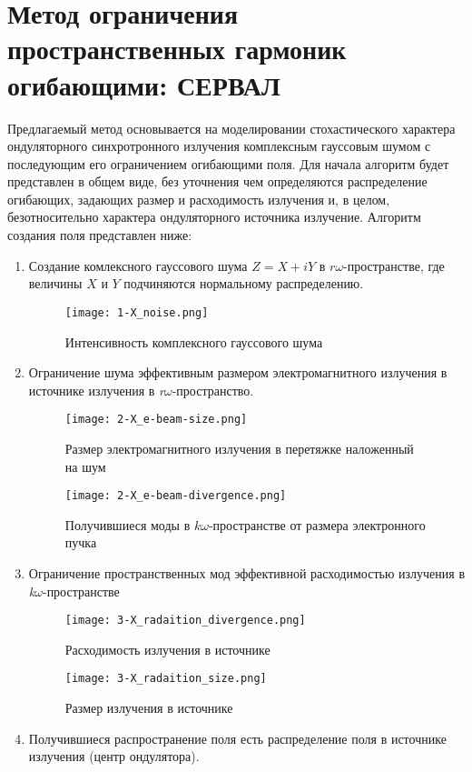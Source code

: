 \section{Метод ограничения пространственных гармоник огибающими: СЕРВАЛ}
Предлагаемый метод основывается на моделировании стохастического характера ондуляторного синхротронного излучения комплексным гауссовым шумом с последующим его ограничением огибающими поля. Для начала алгоритм будет представлен в общем виде, без уточнения чем определяются распределение огибающих, задающих размер и расходимость излучения и, в целом, безотносительно характера ондуляторного источника излучение. Алгоритм создания поля представлен ниже: 
\begin{enumerate}
\item \label{noise} Создание комлексного гауссового шума $Z = X + iY$ в $r\omega$-пространстве, где величины $X$ и $Y$ подчиняются нормальному распределению.
\begin{figure}[H] 
	\centering 	\texttt{[image: 1-X\_noise.png]}
	\caption{Интенсивность комплексного гауссового шума}
	\label{fig:1-noise}
\end{figure}
\item \label{beam_s} Ограничение шума эффективным размером электромагнитного излучения в источнике излучения в \textit{r$\omega$}-пространство.
\begin{figure}[H]
	\centering
	\begin{minipage}{0.45\textwidth}
		\centering
		\texttt{[image: 2-X\_e-beam-size.png]}
		\caption{Размер электромагнитного излучения в перетяжке наложенный на шум}
		\label{fig:2-beam_size_k}
	\end{minipage}
	\begin{minipage}{0.45\textwidth}
		\centering
		\texttt{[image: 2-X\_e-beam-divergence.png]}
		\caption{Получившиеся моды в $k\omega$-пространстве от размера электронного пучка}
		\label{fig:2-beam_size_s}
	\end{minipage}\hfill
\end{figure}
\item \label{beam_k} Ограничение пространственных мод эффективной расходимостью излучения в \textit{k$\omega$}-пространстве
\begin{figure}[H]
	\centering
	\begin{minipage}{0.45\textwidth}
		\centering
		\texttt{[image: 3-X\_radaition\_divergence.png]}
		\caption{Расходимость излучения в источнике}
		\label{fig:3-beam_s}
	\end{minipage}
	\begin{minipage}{0.45\textwidth}
		\centering
		\texttt{[image: 3-X\_radaition\_size.png]}
		\caption{Размер излучения в источнике}
		\label{fig:3-beam_k}
	\end{minipage}
\end{figure}
\item Получившиеся распространение поля есть распределение поля в источнике излучения (центр ондулятора).
\end{enumerate}
